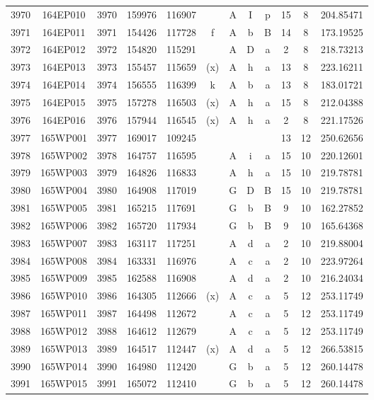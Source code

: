 \begin{tabular}{|*{12}{c|}}
3970 & 164EP010 & 3970 & 159976 & 116907 &  & A & I & p & 15 & 8 & 204.85471 \\ 
3971 & 164EP011 & 3971 & 154426 & 117728 & f & A & b & B & 14 & 8 & 173.19525 \\ 
3972 & 164EP012 & 3972 & 154820 & 115291 &  & A & D & a & 2 & 8 & 218.73213 \\ 
3973 & 164EP013 & 3973 & 155457 & 115659 & (x) & A & h & a & 13 & 8 & 223.16211 \\ 
3974 & 164EP014 & 3974 & 156555 & 116399 & k & A & b & a & 13 & 8 & 183.01721 \\ 
3975 & 164EP015 & 3975 & 157278 & 116503 & (x) & A & h & a & 15 & 8 & 212.04388 \\ 
3976 & 164EP016 & 3976 & 157944 & 116545 & (x) & A & h & a & 2 & 8 & 221.17526 \\ 
3977 & 165WP001 & 3977 & 169017 & 109245 &  &  &  &  & 13 & 12 & 250.62656 \\ 
3978 & 165WP002 & 3978 & 164757 & 116595 &  & A & i & a & 15 & 10 & 220.12601 \\ 
3979 & 165WP003 & 3979 & 164826 & 116833 &  & A & h & a & 15 & 10 & 219.78781 \\ 
3980 & 165WP004 & 3980 & 164908 & 117019 &  & G & D & B & 15 & 10 & 219.78781 \\ 
3981 & 165WP005 & 3981 & 165215 & 117691 &  & G & b & B & 9 & 10 & 162.27852 \\ 
3982 & 165WP006 & 3982 & 165720 & 117934 &  & G & b & B & 9 & 10 & 165.64368 \\ 
3983 & 165WP007 & 3983 & 163117 & 117251 &  & A & d & a & 2 & 10 & 219.88004 \\ 
3984 & 165WP008 & 3984 & 163331 & 116976 &  & A & c & a & 2 & 10 & 223.97264 \\ 
3985 & 165WP009 & 3985 & 162588 & 116908 &  & A & d & a & 2 & 10 & 216.24034 \\ 
3986 & 165WP010 & 3986 & 164305 & 112666 & (x) & A & c & a & 5 & 12 & 253.11749 \\ 
3987 & 165WP011 & 3987 & 164498 & 112672 &  & A & c & a & 5 & 12 & 253.11749 \\ 
3988 & 165WP012 & 3988 & 164612 & 112679 &  & A & c & a & 5 & 12 & 253.11749 \\ 
3989 & 165WP013 & 3989 & 164517 & 112447 & (x) & A & d & a & 5 & 12 & 266.53815 \\ 
3990 & 165WP014 & 3990 & 164980 & 112420 &  & G & b & a & 5 & 12 & 260.14478 \\ 
3991 & 165WP015 & 3991 & 165072 & 112410 &  & G & b & a & 5 & 12 & 260.14478 \\ 

\end{tabular}
